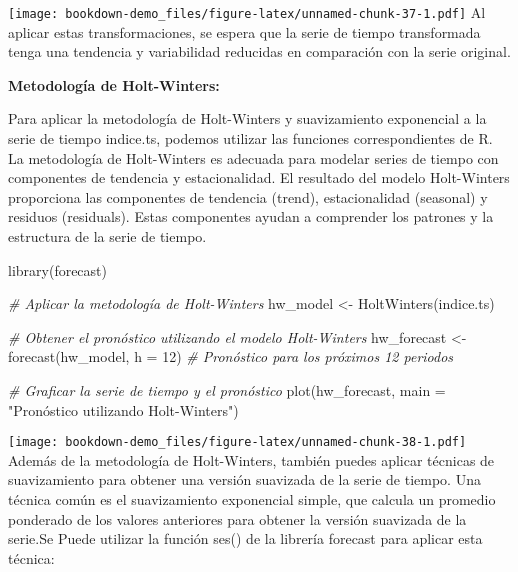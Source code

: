 \documentclass[
]{book}
\newenvironment{Shaded}{\begin{snugshade}}{\end{snugshade}}
\newcommand{\AttributeTok}[1]{\textcolor[rgb]{0.77,0.63,0.00}{#1}}
\newcommand{\CommentTok}[1]{\textcolor[rgb]{0.56,0.35,0.01}{\textit{#1}}}
\newcommand{\DecValTok}[1]{\textcolor[rgb]{0.00,0.00,0.81}{#1}}
\newcommand{\FunctionTok}[1]{\textcolor[rgb]{0.00,0.00,0.00}{#1}}
\newcommand{\NormalTok}[1]{#1}
\newcommand{\OtherTok}[1]{\textcolor[rgb]{0.56,0.35,0.01}{#1}}
\newcommand{\StringTok}[1]{\textcolor[rgb]{0.31,0.60,0.02}{#1}}
\begin{document}
\texttt{[image: bookdown-demo\_files/figure-latex/unnamed-chunk-37-1.pdf]}
Al aplicar estas transformaciones, se espera que la serie de tiempo transformada tenga una tendencia y variabilidad reducidas en comparación con la serie original.

\textbf{Metodología de Holt-Winters:}

Para aplicar la metodología de Holt-Winters y suavizamiento exponencial a la serie de tiempo indice.ts, podemos utilizar las funciones correspondientes de R. La metodología de Holt-Winters es adecuada para modelar series de tiempo con componentes de tendencia y estacionalidad.
El resultado del modelo Holt-Winters proporciona las componentes de tendencia (trend), estacionalidad (seasonal) y residuos (residuals). Estas componentes ayudan a comprender los patrones y la estructura de la serie de tiempo.

\begin{Shaded}
\begin{Highlighting}[]
\FunctionTok{library}\NormalTok{(forecast)}

\CommentTok{\# Aplicar la metodología de Holt{-}Winters}
\NormalTok{hw\_model }\OtherTok{\textless{}{-}} \FunctionTok{HoltWinters}\NormalTok{(indice.ts)}

\CommentTok{\# Obtener el pronóstico utilizando el modelo Holt{-}Winters}
\NormalTok{hw\_forecast }\OtherTok{\textless{}{-}} \FunctionTok{forecast}\NormalTok{(hw\_model, }\AttributeTok{h =} \DecValTok{12}\NormalTok{)  }\CommentTok{\# Pronóstico para los próximos 12 periodos}

\CommentTok{\# Graficar la serie de tiempo y el pronóstico}
\FunctionTok{plot}\NormalTok{(hw\_forecast, }\AttributeTok{main =} \StringTok{"Pronóstico utilizando Holt{-}Winters"}\NormalTok{)}
\end{Highlighting}
\end{Shaded}

\texttt{[image: bookdown-demo\_files/figure-latex/unnamed-chunk-38-1.pdf]}
Además de la metodología de Holt-Winters, también puedes aplicar técnicas de suavizamiento para obtener una versión suavizada de la serie de tiempo. Una técnica común es el suavizamiento exponencial simple, que calcula un promedio ponderado de los valores anteriores para obtener la versión suavizada de la serie.Se Puede utilizar la función ses() de la librería forecast para aplicar esta técnica:
\end{document}
